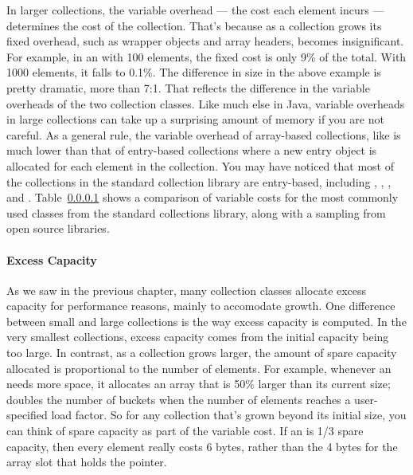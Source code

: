 In larger collections, the variable overhead --- the cost each element incurs
--- determines the cost of the collection. That's because as a collection grows its fixed overhead,
such as wrapper objects and array headers, becomes insignificant. For example,
in an  with 100 elements, the fixed cost is only 9\% of the total. With 1000
elements, it falls to 0.1\%.  The difference in size in the above example is
pretty dramatic, more than 7:1.  That reflects the difference in the variable overheads of the two
collection classes. Like much else in Java, variable overheads in large
collections can take up a surprising amount of memory if you are not careful.
As a general rule,
the variable overhead of array-based collections, like  is much lower than that of 
entry-based collections where a new entry
object is allocated for each element in the collection. You may have noticed
that most of the collections in the standard collection library are entry-based,
including , , , and . Table~\ref{} shows a
comparison of variable costs for the most commonly used classes from the standard collections library, 
along with a sampling from open source libraries.



\paragraph{Excess Capacity} As we saw in the previous chapter, many collection
classes allocate excess capacity for performance reasons, mainly to accomodate
growth. One difference between small and large collections is the way
excess capacity is computed.  In the very smallest collections, excess capacity
comes from the initial capacity being too large. In contrast, as a collection
grows larger, the amount of spare capacity allocated is proportional to the
number of elements. For example, whenever an  needs
more space, it allocates an array that is 50\% larger than its current
size;  doubles the number of buckets when the number
of elements reaches a user-specified load factor. So for any collection that's
grown beyond its initial size, you can 
think of spare capacity as part of the variable cost.
If an  is 1/3 spare capacity, then every
element really costs 6 bytes, rather than the 4 bytes for the array slot that
holds the pointer.

